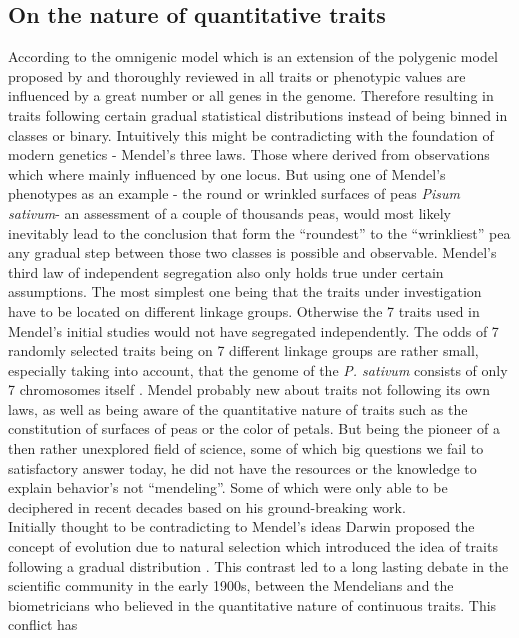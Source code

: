 \subsection{On the nature of quantitative traits} \label{quan} According to the omnigenic model which is an
extension of the polygenic model proposed by \cite{boyle2017expanded} and thoroughly reviewed in
\cite{timpson2018} all traits or phenotypic values are influenced by a great number or all genes in the
genome. Therefore resulting in traits following certain gradual statistical distributions instead of being
binned in classes or binary. Intuitively this might be contradicting with the foundation of modern genetics -
Mendel's three laws. Those where derived from observations which where mainly influenced by one locus. But
using one of Mendel's phenotypes as an example - the round or wrinkled surfaces of peas \textit{Pisum
  sativum}- an assessment of a couple of thousands peas, would most likely inevitably lead to the conclusion
that form the ``roundest'' to the ``wrinkliest'' pea any gradual step between those two classes is possible
and observable. Mendel's third law of independent segregation also only holds true under certain
assumptions. The most simplest one being that the traits under investigation have to be located on different
linkage groups. Otherwise the 7 traits used in Mendel's initial studies would not have segregated
independently. The odds of 7 randomly selected traits being on 7 different linkage groups are rather small,
especially taking into account, that the genome of the \textit{P. sativum} consists of only 7 chromosomes
itself \cite{kalo2004}. Mendel probably new about traits not following its own laws, as well as being aware of
the quantitative nature of traits such as the constitution of surfaces of peas or the color of petals. But
being the pioneer of a then rather unexplored field of science, some of which big questions we fail to
satisfactory answer today, he did not have the resources or the knowledge to explain behavior's not
``mendeling''. Some of which were only able to be deciphered in recent decades based on his ground-breaking work. \\
Initially thought to be contradicting to Mendel's ideas Darwin proposed the concept of evolution due to
natural selection which introduced the idea of traits following a gradual distribution \cite{darwin1859}. This
contrast led to a long lasting debate in the scientific community in the early 1900s, between the Mendelians
and the biometricians who believed in the quantitative nature of continuous traits. This conflict has
